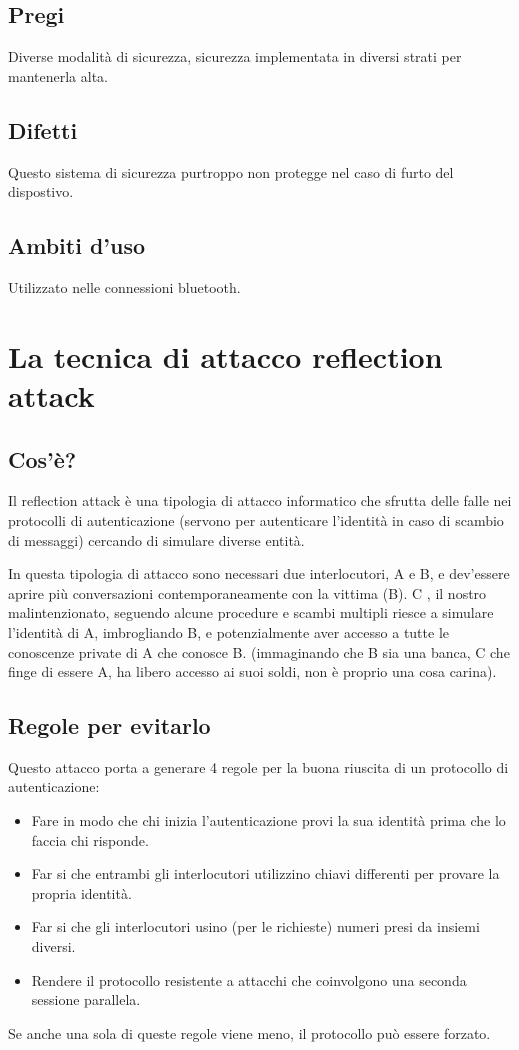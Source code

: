 \subsection{Pregi}
Diverse modalità di sicurezza, sicurezza implementata in diversi strati per mantenerla alta.
\subsection{Difetti}
Questo sistema di sicurezza purtroppo non protegge nel caso di furto del dispostivo.
\subsection{Ambiti d'uso}
Utilizzato nelle connessioni bluetooth.

\section{La tecnica di attacco reflection attack}
\subsection{Cos'è?}
Il reflection attack è una tipologia di attacco informatico che sfrutta delle falle nei protocolli di autenticazione (servono per autenticare l’identità in caso di scambio di messaggi) cercando di simulare diverse entità.

In questa tipologia di attacco sono necessari due interlocutori, A e B, e dev’essere aprire più conversazioni contemporaneamente con la vittima (B).
C , il nostro malintenzionato, seguendo alcune procedure e scambi multipli riesce a simulare l’identità di A, imbrogliando B, e potenzialmente aver accesso a tutte le conoscenze private di A che conosce B. (immaginando che B sia una banca, C che finge di essere A, ha libero accesso ai suoi soldi, non è proprio una cosa carina).
\subsection{Regole per evitarlo}
Questo attacco porta a generare 4 regole per la buona riuscita di un protocollo di autenticazione:
\begin{itemize}
\item	Fare in modo che chi inizia l’autenticazione provi la sua identità prima che lo faccia chi risponde.
\item	Far si che entrambi gli interlocutori utilizzino chiavi differenti per provare la propria identità.
\item	Far si che gli interlocutori usino (per le richieste) numeri presi da insiemi diversi.
\item	Rendere il protocollo resistente a attacchi che coinvolgono una seconda sessione parallela.
\end{itemize}
Se anche una sola di queste regole viene meno, il protocollo può essere forzato.

